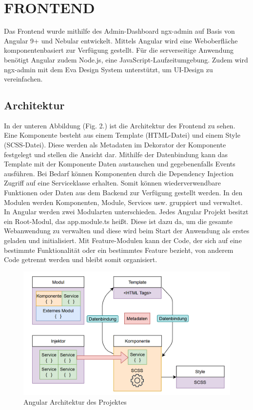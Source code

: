 \section{FRONTEND}\label{ch:frontend}

Das Frontend wurde mithilfe des Admin-Dashboard ngx-admin auf Basis von Angular 9+ und Nebular entwickelt. Mittels Angular wird eine Weboberfläche komponentenbasiert zur Verfügung gestellt. Für die serverseitige Anwendung benötigt Angular zudem Node.js, eine JavaScript-Laufzeitumgebung. Zudem wird ngx-admin mit dem Eva Design System unterstützt, um UI-Design zu vereinfachen. 

\subsection{Architektur}

In der unteren Abbildung (Fig. 2.) ist die Architektur des Frontend zu sehen. Eine Komponente besteht aus einem Template (HTML-Datei) und einem Style (SCSS-Datei). Diese werden als Metadaten im Dekorator der Komponente festgelegt und stellen die Ansicht dar. Mithilfe der Datenbindung kann das Template mit der Komponente Daten austauschen und gegebenenfalls Events ausführen. Bei Bedarf können Komponenten durch die Dependency Injection Zugriff auf eine Serviceklasse erhalten. Somit können wiederverwendbare Funktionen oder Daten aus dem Backend zur Verfügung gestellt werden. In den Modulen werden Komponenten, Module, Services usw. gruppiert und verwaltet. In Angular werden zwei Modularten unterschieden. Jedes Angular Projekt besitzt ein Root-Modul, das app.module.ts heißt. Diese ist dazu da, um die gesamte Webanwendung zu verwalten und diese wird beim Start der Anwendung als erstes geladen und initialisiert. Mit Feature-Modulen kann der Code, der sich auf eine bestimmte Funktionalität oder ein bestimmtes Feature bezieht, von anderem Code getrennt werden und bleibt somit organisiert.

\begin{figure}[thpb]
      \centering
      \includegraphics[scale=0.55]{abbildungen/frontend_architecture.png}
      \caption{Angular Architektur des Projektes}
      \label{fig:frontend}
 \end{figure}


